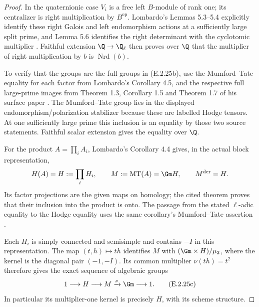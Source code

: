 \begin{proof}
In the quaternionic case \(V_i\) is a free left
\(B\)-module of rank one; its centralizer is right
multiplication by \(B^{\mathrm{op}}\). Lombardo's
Lemmas 5.3--5.4 explicitly identify these right Galois
and left endomorphism actions at a sufficiently large
split prime, and Lemma 5.6 identifies the right
determinant with the cyclotomic multiplier
\cite[Lemmas 5.3--5.6, pp.~19--20]
{GenLombardoSurfaces2015}. Faithful extension
\(\Q\to\Q_\ell\) then proves over \(\Q\) that the
multiplier of right multiplication by \(b\) is
\(\operatorname{Nrd}(b)\).

To verify that the groups are the full groups in
(E.2.25b), use the Mumford--Tate equality for each
factor from Lombardo's Corollary 4.5, and the respective
full large-prime images from Theorem 1.3, Corollary 1.5
and Theorem 1.7 of his surface paper
\cite[Theorem 1.3, p.~2; Corollary 1.5 and
Theorem 1.7, p.~3]{GenLombardoSurfaces2015}.
The Mumford--Tate group lies in the displayed
endomorphism/polarization stabilizer because these
are labelled Hodge tensors. At one sufficiently large
prime this inclusion is an equality by those two
source statements. Faithful scalar extension gives
the equality over \(\Q\).

For the product \(A=\prod_i A_i\), Lombardo's
Corollary 4.4 gives, in the actual block representation,
\[
 H(A)=H:=\prod_i H_i,\qquad
 M:=\operatorname{MT}(A)=\Gm H,
 \qquad M^{\mathrm{der}}=H.
\]
Its factor projections are the given maps on homology;
the cited theorem proves that their inclusion into
the product is onto. The passage from the stated
\(\ell\)-adic equality to the Hodge equality uses
the same corollary's Mumford--Tate assertion
\cite[Corollary 4.4, p.~12]{GenLombardoNonsimple2015}.

Each \(H_i\) is simply connected and semisimple and
contains \(-I\) in this representation. The map
\((t,h)\mapsto th\) identifies \(M\) with
\((\Gm\times H)/\mu_2\), where the kernel is the
diagonal pair \((-1,-I)\). Its common multiplier
\(\nu(th)=t^2\) therefore gives the exact sequence
of algebraic groups
\[
 1\longrightarrow H\longrightarrow M
       \xrightarrow{\nu}\Gm\longrightarrow1.
 \tag{E.2.25c}
\]
In particular its multiplier-one kernel is precisely
\(H\), with its scheme structure.


\end{proof}
